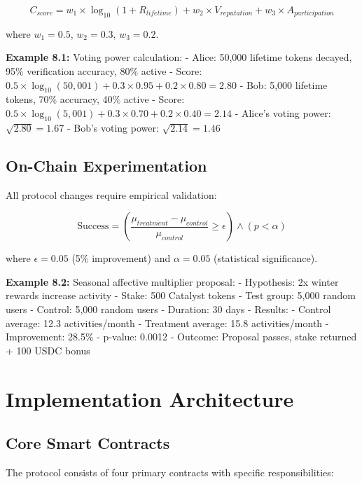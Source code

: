 \documentclass[11pt,letterpaper]{article}
\begin{document}
\begin{equation}
C_{score} = w_1 \times \log_{10}(1 + R_{lifetime}) + w_2 \times V_{reputation} + w_3 \times A_{participation}
\end{equation}

where $w_1 = 0.5$, $w_2 = 0.3$, $w_3 = 0.2$.

\textbf{Example 8.1:} Voting power calculation:
- Alice: 50,000 lifetime tokens decayed, 95\% verification accuracy, 80\% active
  - Score: $0.5 \times \log_{10}(50,001) + 0.3 \times 0.95 + 0.2 \times 0.80 = 2.80$
- Bob: 5,000 lifetime tokens, 70\% accuracy, 40\% active
  - Score: $0.5 \times \log_{10}(5,001) + 0.3 \times 0.70 + 0.2 \times 0.40 = 2.14$
- Alice's voting power: $\sqrt{2.80} = 1.67$
- Bob's voting power: $\sqrt{2.14} = 1.46$

\subsection{On-Chain Experimentation}

All protocol changes require empirical validation:

\begin{equation}
\text{Success} = \left(\frac{\mu_{treatment} - \mu_{control}}{\mu_{control}} \geq \epsilon\right) \land (p < \alpha)
\end{equation}

where $\epsilon = 0.05$ (5\% improvement) and $\alpha = 0.05$ (statistical significance).

\textbf{Example 8.2:} Seasonal affective multiplier proposal:
- Hypothesis: 2x winter rewards increase activity
- Stake: 500 Catalyst tokens
- Test group: 5,000 random users
- Control: 5,000 random users
- Duration: 30 days
- Results: 
  - Control average: 12.3 activities/month
  - Treatment average: 15.8 activities/month
  - Improvement: 28.5\%
  - p-value: 0.0012
- Outcome: Proposal passes, stake returned + 100 USDC bonus

\section{Implementation Architecture}

\subsection{Core Smart Contracts}

The protocol consists of four primary contracts with specific responsibilities:
\end{document}
